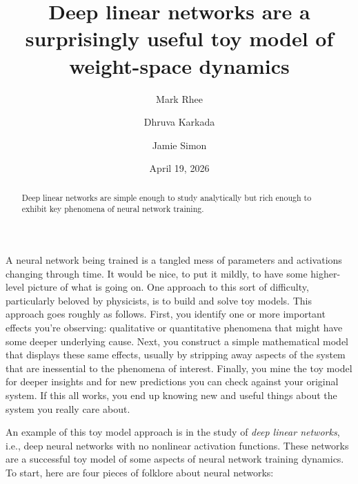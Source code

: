 \documentclass[12pt]{article}
\title{Deep linear networks are a surprisingly useful toy model of weight-space dynamics}
\author{Mark Rhee \and Dhruva Karkada \and Jamie Simon}
\date{April 19, 2026}
\begin{document}
\maketitle

\begin{abstract}
Deep linear networks are simple enough to study analytically but rich enough to exhibit key phenomena of neural network training.
\end{abstract}

A neural network being trained is a tangled mess of parameters and activations changing through time. It would be nice, to put it mildly, to have some higher-level picture of what is going on. One approach to this sort of difficulty, particularly beloved by physicists, is to build and solve toy models. This approach goes roughly as follows. First, you identify one or more important effects you're observing: qualitative or quantitative phenomena that might have some deeper underlying cause. Next, you construct a simple mathematical model that displays these same effects, usually by stripping away aspects of the system that are inessential to the phenomena of interest. Finally, you mine the toy model for deeper insights and for new predictions you can check against your original system. If this all works, you end up knowing new and useful things about the system you really care about.

An example of this toy model approach is in the study of \emph{deep linear networks}, i.e., deep neural networks with no nonlinear activation functions. These networks are a successful toy model of some aspects of neural network training dynamics. To start, here are four pieces of folklore about neural networks:
\end{document}

